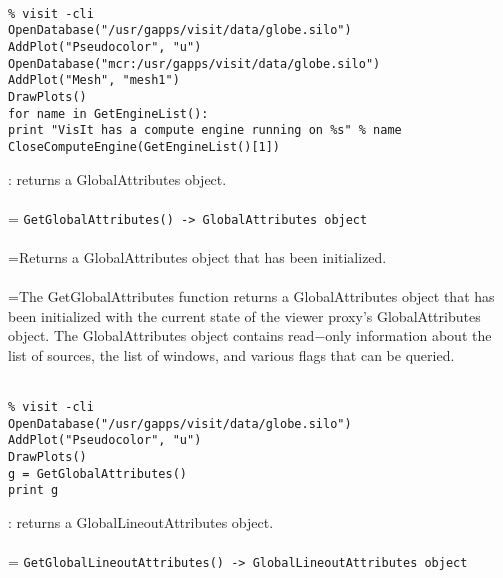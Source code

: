\documentclass[10pt,a4paper]{report}
\begin{document}
\\[-6mm]
\begin{verbatim}% visit -cli
OpenDatabase("/usr/gapps/visit/data/globe.silo")
AddPlot("Pseudocolor", "u")
OpenDatabase("mcr:/usr/gapps/visit/data/globe.silo")
AddPlot("Mesh", "mesh1")
DrawPlots()
for name in GetEngineList():
print "VisIt has a compute engine running on %s" % name
CloseComputeEngine(GetEngineList()[1])
\end{verbatim}
\newpage


{}
: returns a GlobalAttributes object.\\[-3mm]

 \\ 
\hangindent=\parindent 
\verb!GetGlobalAttributes() -> GlobalAttributes object!\\ [-3mm]

 \\ 
\hangindent=\parindent Returns a GlobalAttributes object that has been initialized. \\[-3mm] 

 \\ 
\hangindent=\parindent The GetGlobalAttributes function returns a GlobalAttributes object that has been initialized with the current state of the viewer proxy's GlobalAttributes object. The GlobalAttributes object contains read$-$only information about the list of sources, the list of windows, and various flags that can be queried. \\[-3mm] 

\\[-6mm]
\begin{verbatim}% visit -cli
OpenDatabase("/usr/gapps/visit/data/globe.silo")
AddPlot("Pseudocolor", "u")
DrawPlots()
g = GetGlobalAttributes()
print g
\end{verbatim}
\newpage


{}
: returns a GlobalLineoutAttributes object.\\[-3mm]

 \\ 
\hangindent=\parindent 
\verb!GetGlobalLineoutAttributes() -> GlobalLineoutAttributes object!\\ [-3mm]
\end{document}
